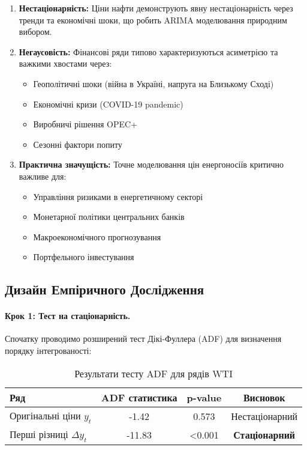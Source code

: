 \documentclass[12pt,a4paper]{article}
\begin{document}
\begin{enumerate}
    \item \textbf{Нестаціонарність:} Ціни нафти демонструють явну нестаціонарність через тренди та економічні шоки, що робить ARIMA моделювання природним вибором.

    \item \textbf{Негаусовість:} Фінансові ряди типово характеризуються асиметрією та важкими хвостами через:
    \begin{itemize}
        \item Геополітичні шоки (війна в Україні, напруга на Близькому Сході)
        \item Економічні кризи (COVID-19 pandemic)
        \item Виробничі рішення OPEC+
        \item Сезонні фактори попиту
    \end{itemize}

    \item \textbf{Практична значущість:} Точне моделювання цін енергоносіїв критично важливе для:
    \begin{itemize}
        \item Управління ризиками в енергетичному секторі
        \item Монетарної політики центральних банків
        \item Макроекономічного прогнозування
        \item Портфельного інвестування
    \end{itemize}
\end{enumerate}

\subsection{Дизайн Емпіричного Дослідження}
\label{subsec:wti_research_design}

\paragraph{Крок 1: Тест на стаціонарність.}
Спочатку проводимо розширений тест Дікі-Фуллера (ADF) для визначення порядку інтегрованості:

\begin{table}[h]
\centering
\caption{Результати тесту ADF для рядів WTI}
\label{tab:wti_adf_test}
\begin{tabular}{lccc}
\toprule
\textbf{Ряд} & \textbf{ADF статистика} & \textbf{p-value} & \textbf{Висновок} \\
\midrule
Оригінальні ціни $y_t$ & -1.42 & 0.573 & Нестаціонарний \\
Перші різниці $\Delta y_t$ & -11.83 & <0.001 & \textbf{Стаціонарний} \\
\bottomrule
\end{tabular}
\end{table}
\end{document}
